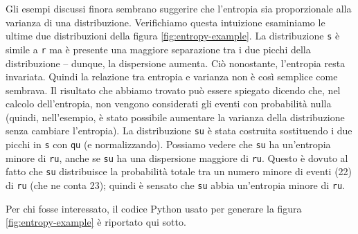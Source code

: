 \documentclass[
  11pt,
]{krantz}
\theoremstyle{definition}
\theoremstyle{definition}
\theoremstyle{definition}
\theoremstyle{definition}
\theoremstyle{remark}
\begin{document}
Gli esempi discussi finora sembrano suggerire che l'entropia sia proporzionale alla varianza di una distribuzione. Verifichiamo questa intuizione esaminiamo le ultime due distribuzioni della figura \ref{fig:entropy-example}. La distribuzione \texttt{s} è simile a \texttt{r} ma è presente una maggiore separazione tra i due picchi della distribuzione -- dunque, la dispersione aumenta. Ciò nonostante, l'entropia resta invariata. Quindi la relazione tra entropia e varianza non è così semplice come sembrava. Il risultato che abbiamo trovato può essere spiegato dicendo che, nel calcolo dell'entropia, non vengono considerati gli eventi con probabilità nulla (quindi, nell'esempio, è stato possibile aumentare la varianza della distribuzione senza cambiare l'entropia). La distribuzione \texttt{su} è stata costruita sostituendo i due picchi in \texttt{s} con \texttt{qu} (e normalizzando). Possiamo vedere che \texttt{su} ha un'entropia minore di \texttt{ru}, anche se \texttt{su} ha una dispersione maggiore di \texttt{ru}. Questo è dovuto al fatto che \texttt{su} distribuisce la probabilità totale tra un numero minore di eventi (22) di \texttt{ru} (che ne conta 23); quindi è sensato che \texttt{su} abbia un'entropia minore di \texttt{ru}.

Per chi fosse interessato, il codice Python usato per generare la figura \ref{fig:entropy-example} è riportato qui sotto.
\end{document}
